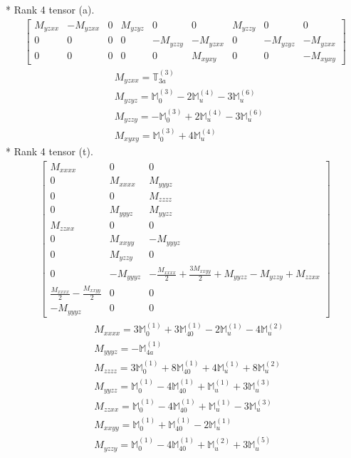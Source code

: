 \documentclass[fleqn,8pt,landscape]{jsarticle}
\begin{document}
* Rank 4 tensor (a).
\begin{align*}
\begin{bmatrix} M_{yzxx} & - M_{yzxx} & 0 & M_{yzyz} & 0 & 0 & M_{yzzy} & 0 & 0 \\ 0 & 0 & 0 & 0 & - M_{yzzy} & - M_{yzxx} & 0 & - M_{yzyz} & - M_{yzxx} \\ 0 & 0 & 0 & 0 & 0 & M_{xyxy} & 0 & 0 & - M_{xyxy} \end{bmatrix}
\end{align*}
\begin{align*}
& M_{yzxx} = \mathbb{T}_{3a}^{(3)} \\
& M_{yzyz} = \mathbb{M}_{0}^{(3)} - 2 \mathbb{M}_{u}^{(4)} - 3 \mathbb{M}_{u}^{(6)} \\
& M_{yzzy} = - \mathbb{M}_{0}^{(3)} + 2 \mathbb{M}_{u}^{(4)} - 3 \mathbb{M}_{u}^{(6)} \\
& M_{xyxy} = \mathbb{M}_{0}^{(3)} + 4 \mathbb{M}_{u}^{(4)}
\end{align*}
* Rank 4 tensor (t).
\begin{align*}
\begin{bmatrix} M_{xxxx} & 0 & 0 \\ 0 & M_{xxxx} & M_{yyyz} \\ 0 & 0 & M_{zzzz} \\ 0 & M_{yyyz} & M_{yyzz} \\ M_{zzxx} & 0 & 0 \\ 0 & M_{xxyy} & - M_{yyyz} \\ 0 & M_{yzzy} & 0 \\ 0 & - M_{yyyz} & - \frac{M_{xxxx}}{2} + \frac{3 M_{xxyy}}{2} + M_{yyzz} - M_{yzzy} + M_{zzxx} \\ \frac{M_{xxxx}}{2} - \frac{M_{xxyy}}{2} & 0 & 0 \\ - M_{yyyz} & 0 & 0 \end{bmatrix}
\end{align*}
\begin{align*}
& M_{xxxx} = 3 \mathbb{M}_{0}^{(1)} + 3 \mathbb{M}_{40}^{(1)} - 2 \mathbb{M}_{u}^{(1)} - 4 \mathbb{M}_{u}^{(2)} \\
& M_{yyyz} = - \mathbb{M}_{4a}^{(1)} \\
& M_{zzzz} = 3 \mathbb{M}_{0}^{(1)} + 8 \mathbb{M}_{40}^{(1)} + 4 \mathbb{M}_{u}^{(1)} + 8 \mathbb{M}_{u}^{(2)} \\
& M_{yyzz} = \mathbb{M}_{0}^{(1)} - 4 \mathbb{M}_{40}^{(1)} + \mathbb{M}_{u}^{(1)} + 3 \mathbb{M}_{u}^{(3)} \\
& M_{zzxx} = \mathbb{M}_{0}^{(1)} - 4 \mathbb{M}_{40}^{(1)} + \mathbb{M}_{u}^{(1)} - 3 \mathbb{M}_{u}^{(3)} \\
& M_{xxyy} = \mathbb{M}_{0}^{(1)} + \mathbb{M}_{40}^{(1)} - 2 \mathbb{M}_{u}^{(1)} \\
& M_{yzzy} = \mathbb{M}_{0}^{(1)} - 4 \mathbb{M}_{40}^{(1)} + \mathbb{M}_{u}^{(2)} + 3 \mathbb{M}_{u}^{(5)}
\end{align*}
\end{document}
